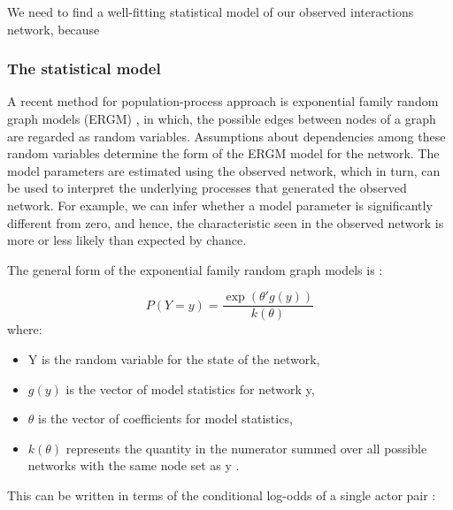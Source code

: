 \documentclass{acm_proc_article-sp}
\begin{document}
We need to find a well-fitting statistical model of our observed interactions network, because 

\subsubsection{The statistical model}

A recent method for population-process approach is exponential family random graph models (ERGM) \cite{Robins}, in which, the possible edges between nodes of a graph are regarded as random variables. Assumptions about dependencies among these random variables determine the form of the ERGM model for the network. The model parameters are estimated using the observed network, which in turn, can be used to interpret the underlying processes that generated the observed network. For example, we can infer whether a model parameter is significantly different from zero, and hence, the characteristic seen in the observed network is more or less likely than expected by chance.

The general form of the exponential family random graph models is \cite{Krivitsky}: 

\begin{equation} P(Y=y)=\frac{\exp(\theta'g(y))}{k(\theta)} \end{equation}
where:
\begin{itemize}
\item Y is the random variable for the state of the network,
\item \( g(y) \) is the vector of model statistics for network y,
\item \( \theta \) is the vector of coefficients for model statistics, 
\item \( k(\theta) \) represents the quantity in the numerator summed over all possible networks with the same node set as y \cite{Krivitsky}.
\end{itemize}
This can be written in terms of the conditional log-odds of a single actor pair \cite{Krivitsky}:
\end{document}
